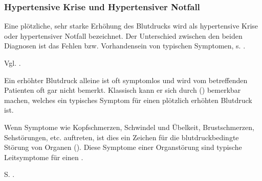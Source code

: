 \subsubsection{Hypertensive Krise und Hypertensiver Notfall}
\label{topic:hypertensive-krise}
\label{topic:hypertensiver-notfall}

{%
Eine plötzliche, sehr starke Erhöhung des Blutdrucks wird
als hypertensive Krise oder hypertensiver Notfall
bezeichnet. Der Unterschied zwischen den beiden Diagnosen
ist das Fehlen bzw. Vorhandensein von typischen Symptomen,
s.
.

}{}{}{}{}

{%
Vgl. .

Ein erhöhter Blutdruck alleine ist oft symptomlos und wird
vom betreffenden Patienten oft gar nicht bemerkt.
Klassisch kann er sich durch 
() bemerkbar machen, welches
ein typisches Symptom für einen plötzlich erhöhten Blutdruck
ist.

Wenn Symptome wie Kopfschmerzen, Schwindel und Übelkeit,
Brustschmerzen, Sehstörungen, etc. auftreten, ist dies ein
Zeichen für die blutdruckbedingte Störung von Organen
(). Diese Symptome einer Organstörung sind
typische Leitsymptome für einen .

}{
S. .
}{}{}{}

